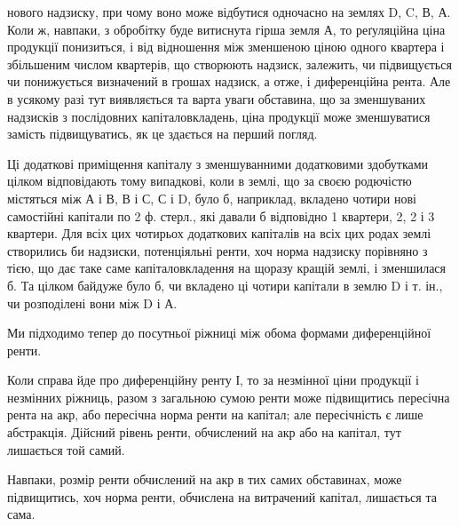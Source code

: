 \parcont{}  %
нового надзиску, при чому воно може відбутися одночасно на землях D, C, В, А.
Коли ж, навпаки, з обробітку буде витиснута гірша земля А, то реґуляційна
ціна продукції понизиться, і від відношення між зменшеною ціною одного
квартера і збільшеним числом квартерів, що створюють надзиск, залежить, чи
підвищується чи понижується визначений в грошах надзиск, а отже, і диференційна
рента. Але в усякому разі тут виявляється та варта уваги обставина,
що за зменшуваних надзисків з послідовних капіталовкладень, ціна продукції
може зменшуватися замість підвищуватись, як це здається на перший погляд.

Ці додаткові приміщення капіталу з зменшуванними додатковими здобутками
цілком відповідають тому випадкові, коли в землі, що за своєю родючістю
містяться між А і В, В і С, С і D, було б, наприклад, вкладено чотири нові
самостійні капітали по 2 ф. стерл., які давали б відповідно 1 квартери,
2, 2 і 3 квартери. Для всіх цих чотирьох додаткових капіталів на всіх
цих родах землі створились би надзиски, потенціяльні ренти, хоч норма надзиску
порівняно з тією, що дає таке саме капіталовкладення на щоразу кращій землі,
і зменшилася б. Та цілком байдуже було б, чи вкладено ці чотири капітали
в землю D і т. ін., чи розподілені вони між D і А.

Ми підходимо тепер до посутньої ріжниці між обома формами диференційної
ренти.

Коли справа йде про диференційну ренту І, то за незмінної ціни продукції
і незмінних ріжниць, разом з загальною сумою ренти може підвищитись
пересічна рента на акр, або пересічна норма ренти на капітал; але пересічність
є лише абстракція. Дійсний рівень ренти, обчислений на акр або на капітал,
тут лишається той самий.

Навпаки, розмір ренти обчислений на акр в тих самих обставинах, може
підвищитись, хоч норма ренти, обчислена на витрачений капітал, лишається
та сама.

